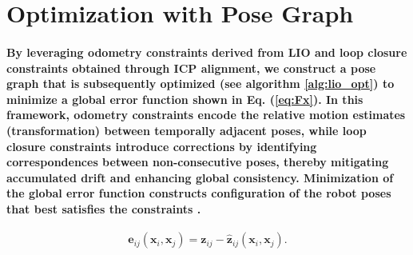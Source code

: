 \section{Optimization with Pose Graph}
\paragraph{\textnormal{By leveraging odometry constraints derived from LIO and loop closure constraints obtained through ICP alignment, we construct a pose graph that is subsequently optimized (see algorithm \ref{alg:lio_opt}) to minimize a global error function shown in Eq. (\ref{eq:Fx}). In this framework, odometry constraints encode the relative motion estimates (transformation) between temporally adjacent poses, while loop closure constraints introduce corrections by identifying correspondences between non-consecutive poses, thereby mitigating accumulated drift and enhancing global consistency. Minimization of the global error function constructs configuration of the robot poses that best satisfies the constraints \cite{grisetti2010tutorial}.  }}

\begin{equation}
	\mathbf{e}_{ij}(\mathbf{x}_i, \mathbf{x}_j) = \mathbf{z}_{ij} - \hat{\mathbf{z}}_{ij}(\mathbf{x}_i, \mathbf{x}_j).
	\label{eq:pgo_error_fun}
\end{equation}

